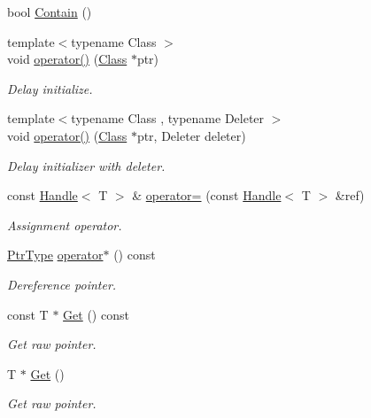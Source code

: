 \begin{DoxyCompactItemize}
bool \hyperlink{classmocha_1_1_handle_aebd20177e8cd12f3a7bb7dc6839c3158}{Contain} ()
\item 
{\footnotesize template$<$typename Class $>$ }\\void \hyperlink{classmocha_1_1_handle_a8b6ed8540590e1199729a891957e7506}{operator()} (\hyperlink{classmocha_1_1_class}{Class} $\ast$ptr)
\begin{DoxyCompactList}\small\item\em Delay initialize. \end{DoxyCompactList}\item 
{\footnotesize template$<$typename Class , typename Deleter $>$ }\\void \hyperlink{classmocha_1_1_handle_a4fd3a6b1cf5323bdc232e00892e02bc4}{operator()} (\hyperlink{classmocha_1_1_class}{Class} $\ast$ptr, Deleter deleter)
\begin{DoxyCompactList}\small\item\em Delay initializer with deleter. \end{DoxyCompactList}\item 
const \hyperlink{classmocha_1_1_handle}{Handle}$<$ T $>$ \& \hyperlink{classmocha_1_1_handle_ad728d4926f6f0c4a1953e1ba4aed4ef4}{operator=} (const \hyperlink{classmocha_1_1_handle}{Handle}$<$ T $>$ \&ref)
\begin{DoxyCompactList}\small\item\em Assignment operator. \end{DoxyCompactList}\item 
\hyperlink{classmocha_1_1_handle_ab0f5eb08d7783139f6c6c17f2e1098d8}{PtrType} \hyperlink{classmocha_1_1_handle_a4c4c0d897044b930998696586e54ac39}{operator$\ast$} () const 
\begin{DoxyCompactList}\small\item\em Dereference pointer. \end{DoxyCompactList}\item 
const T $\ast$ \hyperlink{classmocha_1_1_handle_a25fba36a3db6ba5da853f87bcc3873b6}{Get} () const 
\begin{DoxyCompactList}\small\item\em Get raw pointer. \end{DoxyCompactList}\item 
T $\ast$ \hyperlink{classmocha_1_1_handle_a5e2114880e952d0e9a5548c11d296c00}{Get} ()
\begin{DoxyCompactList}\small\item\em Get raw pointer. \end{DoxyCompactList}\item 

\end{DoxyCompactItemize}
